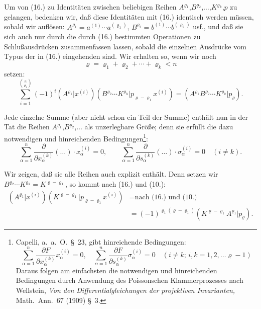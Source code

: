 \documentclass[12pt,a4paper]{article}
\begin{document}
Um von (16.) zu Identitäten zwischen beliebigen Reihen $A^{\varrho_{1}}$,$B^{\varrho_{2}}$,$\ldots$,$K^{\varrho_{k}}$,$p$ zu gelangen, bedenken wir, daß diese Identitäten mit (16.) identisch werden müssen, sobald wir auflösen: $A^{\varrho_{1}} = a^{(1)} \cdots a^{(\varrho_{1})}$, $B^{\varrho_{2}} = b^{(1)} \cdots b^{(\varrho_{2})}$ usf., und daß sie sich auch nur durch die durch (16.) bestimmten Operationen zu Schlußausdrücken zusammenfassen lassen, sobald die einzelnen Ausdrücke vom Typus der in (16.) eingehenden sind. Wir erhalten so, wenn wir noch
\begin{equation}\tag{18}
\varrho = \varrho_{1} + \varrho_{2} + \cdots + \varrho_{k} < n
\end{equation}
setzen:
\begin{equation}\tag{19}
\sum_{i=1}^{\binom{n}{\varrho_{1}}} (-1)^{i} (A^{\varrho_{1}} | x^{(i)})(B^{\varrho_{2}} \cdots K^{\varrho_{k}} | p_{\varrho-\varrho_{1}} x^{(i)}) = (A^{\varrho_{1}} B^{\varrho_{2}} \cdots K^{\varrho_{k}} | p_{\varrho}).
\end{equation}

Jede einzelne Summe (aber nicht schon ein Teil der Summe) enthält nun in der Tat die Reihen $A^{\varrho_{1}}$,$B^{\varrho_{2}}$,$\ldots$ als unzerlegbare Größe; denn sie erfüllt die dazu notwendigen und hinreichenden Bedingungen\footnote{Capelli, a.\ a.\ O.\ \S\ 23, gibt hinreichende Bedingungen:
\[
\sum_{\alpha=1}^{n} \frac{\partial F}{\partial x^{(k)}_{\alpha}} x^{(i)}_{\alpha} = 0, \quad \sum_{\alpha=1}^{n} \frac{\partial F}{\partial s^{(k)}_{\alpha}} \sigma^{(i)}_{\alpha} = 0 \quad (i \neq k; \, i,k = 1,2,\ldots \varrho-1)
\]
Daraus folgen am einfachsten die notwendigen und hinreichenden Bedingungen durch Anwendung des Poissonschen Klammerprozesses nach Wellstein, \textit{Von den Differentialgleichungen der projektiven Invarianten,} Math.\ Ann.\ 67 (1909) \S\ 3.}:
\begin{equation*}
\sum_{\alpha=1}^{n} \frac{\partial}{\partial x^{(k)}_{\alpha}} (\ldots) \cdot x^{(i)}_{\alpha} = 0, \qquad \sum_{\alpha=1}^{n} \frac{\partial}{\partial s^{(k)}_{\alpha}} (\ldots) \cdot \sigma^{(i)}_{\alpha} = 0 \quad (i \neq k).
\end{equation*}

Wir zeigen, daß sie alle Reihen auch explizit enthält. Denn setzen wir $B^{\varrho_{2}} \cdots K^{\varrho_{k}} = K^{\varrho-\varrho_{1}}$, so kommt nach (16.) und (10.):
\begin{align*}
(A^{\varrho_{1}} | x^{(i)})(K^{\varrho-\varrho_{1}} | p_{\varrho-\varrho_{1}} x^{(i)}) &= \text{nach (16.) und (10.)} \\
&= (-1)^{\varrho_{1}(\varrho-\varrho_{1})} (K^{\varrho-\varrho_{1}} A^{\varrho_{1}} | p_{\varrho}).
\end{align*}
\end{document}
